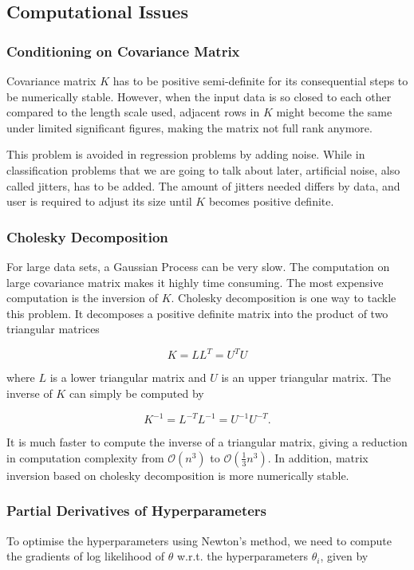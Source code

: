 \documentclass[11pt]{report}
\numberwithin{equation}{chapter}
\begin{document}
\begin{spacing}{2}
\subsection{Computational Issues}

\subsubsection{Conditioning on Covariance Matrix}
Covariance matrix $K$ has to be positive semi-definite for its consequential steps to be numerically stable. However, when the input data is so closed to each other compared to the length scale used, adjacent rows in $K$ might become the same under limited significant figures, making the matrix not full rank anymore.

This problem is avoided in regression problems by adding noise. While in classification problems that we are going to talk about later, artificial noise, also called jitters, has to be added. The amount of jitters needed differs by data, and user is required to adjust its size until $K$ becomes positive definite.

\subsubsection{Cholesky Decomposition}
For large data sets, a Gaussian Process can be very slow. The computation on large covariance matrix makes it highly time consuming. The most expensive computation is the inversion of $K$. Cholesky decomposition is one way to tackle this problem. It decomposes a positive definite matrix into the product of two triangular matrices

\begin{equation}
K = LL^T = U^TU
\end{equation}

where $L$ is a lower triangular matrix and $U$ is an upper triangular matrix. The inverse of $K$ can simply be computed by

\begin{equation}
K^{-1} = L^{-T}L^{-1} = U^{-1}U^{-T}.
\end{equation}

It is much faster to compute the inverse of a triangular matrix, giving a reduction in computation complexity from $\mathcal{O}(n^3)$ to $\mathcal{O}(\frac{1}{3}n^3)$\cite{marelli2015distributed}. In addition, matrix inversion based on cholesky decomposition is more numerically stable.  


\subsubsection{Partial Derivatives of Hyperparameters}
To optimise the hyperparameters using Newton's method, we need to compute the gradients of log likelihood of $\theta$ w.r.t. the hyperparameters $\theta_i$, given by 
 

\end{spacing}
\end{document}
